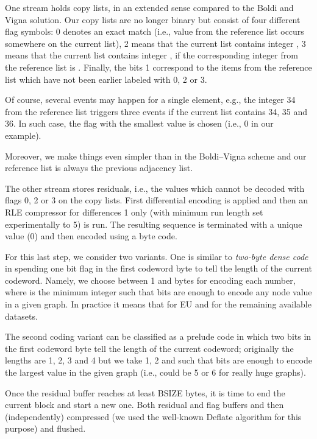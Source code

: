 \documentclass[envcountsame]{llncs}
\begin{document}
One stream holds copy lists, in an extended sense compared to the 
Boldi and Vigna solution.  Our copy lists are no longer binary but consist of 
four different flag symbols: 0 denotes an exact match (i.e., value  from the 
reference list occurs somewhere on the current list), 2 means that the current list 
contains integer , 3 means that the current list contains integer , 
if the corresponding integer from the reference list is .
Finally, the bits 1 correspond to the items from the reference list which have not 
been earlier labeled with 0, 2 or 3.

Of course, several events may happen for a single 
element, e.g., the integer 34 from the reference list triggers three events 
if the current list contains 34, 35 and 36.  In such case, the flag with the 
smallest value is chosen (i.e., 0 in our example).

Moreover, we make things even simpler than in the Boldi--Vigna scheme 
and our reference list is always the previous adjacency list.

The other stream stores residuals, i.e., the values which cannot be decoded 
with flags 0, 2 or 3 on the copy lists. First differential encoding is applied 
and then an RLE compressor for differences 1 only (with minimum run length set 
experimentally to 5) is run. The resulting sequence is terminated with a unique 
value (0) and then encoded using a byte code. 

For this last step, we consider two variants. One is similar to {\em two-byte 
dense code} \cite{DBLP:conf/iwoca/ProchazkaH09} 
in spending one bit flag in the first codeword byte to tell the length of the current 
codeword.  Namely, we choose between 1 and  bytes for encoding each number, 
where  is the minimum integer such that  bits are enough to encode any 
node value in a given graph. In practice it means that  for EU and  for 
the remaining available datasets.

The second coding variant can be classified as a prelude 
code \cite{DBLP:conf/spire/CulpepperM05} in which two bits in the first codeword byte 
tell the length of the current codeword; originally the lengths are 1, 2, 3 and 4 
but we take 1, 2 and  
such that  bits are enough to encode the 
largest value in the given graph (i.e.,  could be 5 or 6 for really huge graphs).

Once the residual buffer reaches at least BSIZE bytes, it is time to end the current 
block and start a new one.  Both residual and flag buffers and then (independently) 
compressed (we used the well-known Deflate algorithm for this purpose) and flushed. 
\end{document}
